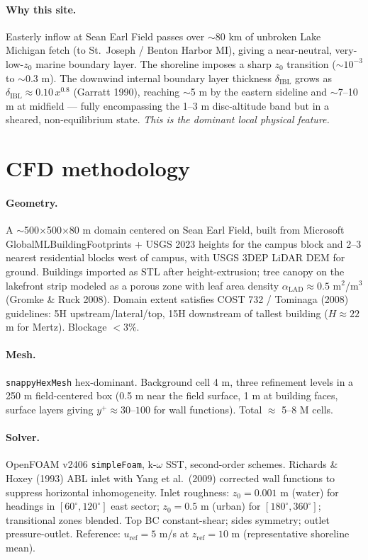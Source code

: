 \documentclass[11pt,letterpaper]{article}
\begin{document}
\paragraph{Why this site.} Easterly inflow at Sean Earl Field passes over $\sim$80 km of unbroken Lake Michigan fetch (to St.\ Joseph / Benton Harbor MI), giving a near-neutral, very-low-$z_0$ marine boundary layer. The shoreline imposes a sharp $z_0$ transition ($\sim 10^{-3}$ to $\sim$0.3 m). The downwind internal boundary layer thickness $\delta_{\text{IBL}}$ grows as $\delta_{\text{IBL}} \approx 0.10\,x^{0.8}$ (Garratt 1990), reaching $\sim$5 m by the eastern sideline and $\sim$7--10 m at midfield --- fully encompassing the 1--3 m disc-altitude band but in a sheared, non-equilibrium state. \emph{This is the dominant local physical feature.}

\section{CFD methodology}

\paragraph{Geometry.} A $\sim$500$\times$500$\times$80 m domain centered on Sean Earl Field, built from Microsoft GlobalMLBuildingFootprints + USGS 2023 heights for the campus block and 2--3 nearest residential blocks west of campus, with USGS 3DEP LiDAR DEM for ground. Buildings imported as STL after height-extrusion; tree canopy on the lakefront strip modeled as a porous zone with leaf area density $\alpha_{\text{LAD}} \approx 0.5$ m$^2$/m$^3$ (Gromke \& Ruck 2008). Domain extent satisfies COST 732 / Tominaga (2008) guidelines: 5H upstream/lateral/top, 15H downstream of tallest building ($H \approx 22$ m for Mertz). Blockage $<3\%$.

\paragraph{Mesh.} \texttt{snappyHexMesh} hex-dominant. Background cell 4 m, three refinement levels in a 250 m field-centered box (0.5 m near the field surface, 1 m at building faces, surface layers giving $y^+ \approx 30$--$100$ for wall functions). Total $\approx$ 5--8 M cells.

\paragraph{Solver.} OpenFOAM v2406 \texttt{simpleFoam}, k-$\omega$ SST, second-order schemes. Richards \& Hoxey (1993) ABL inlet with Yang et al.\ (2009) corrected wall functions to suppress horizontal inhomogeneity. Inlet roughness: $z_0 = 0.001$ m (water) for headings in $[60^\circ, 120^\circ]$ east sector; $z_0 = 0.5$ m (urban) for $[180^\circ, 360^\circ]$; transitional zones blended. Top BC constant-shear; sides symmetry; outlet pressure-outlet. Reference: $u_{\text{ref}} = 5$ m/s at $z_{\text{ref}} = 10$ m (representative shoreline mean).
\end{document}

